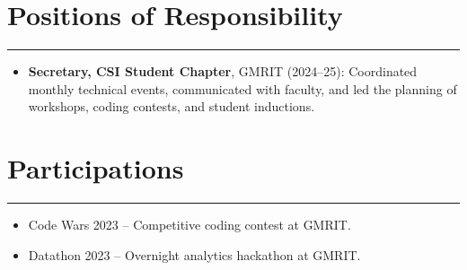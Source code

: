 \documentclass[a4paper,9pt]{article}
\newcommand{\resumesection}[1]{%
  \vspace{6pt}
  \section*{#1}
  \hrule\vspace{4pt}
}
\begin{document}
\resumesection{Positions of Responsibility}
\begin{itemize}[leftmargin=*, noitemsep]
    \item \textbf{Secretary, CSI Student Chapter}, GMRIT (2024–25): Coordinated monthly technical events, communicated with faculty, and led the planning of workshops, coding contests, and student inductions.
\end{itemize}


\resumesection{Participations}
\begin{itemize}[leftmargin=*, noitemsep]
    \item Code Wars 2023 – Competitive coding contest at GMRIT.
    \item Datathon 2023 – Overnight analytics hackathon at GMRIT.
\end{itemize}
\end{document}
